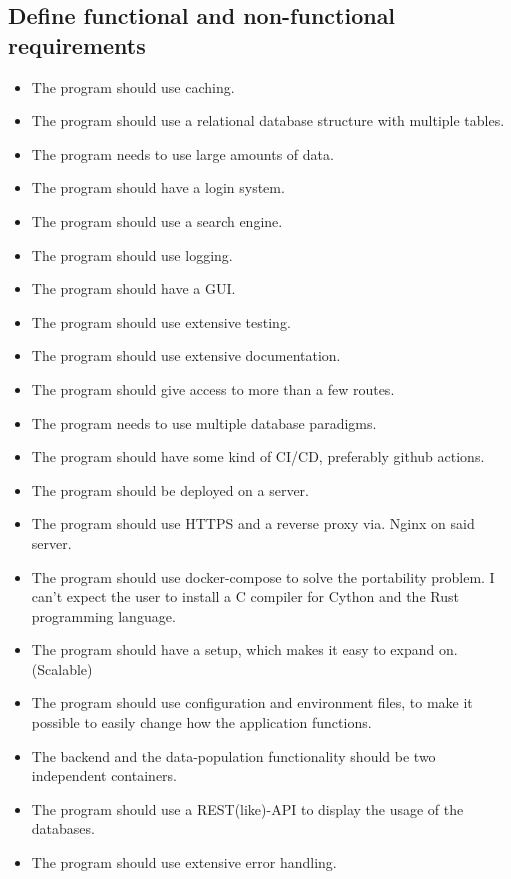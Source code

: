 \documentclass[a4paper, 12pt]{article}
\begin{document}
\subsection{Define functional and non-functional requirements}
\begin{itemize}
	\item The program should use caching.
	\item The program should use a relational database structure with multiple tables.
	\item The program needs to use large amounts of data.
	\item The program should have a login system.
	\item The program should use a search engine.
	\item The program should use logging.
	\item The program should have a GUI.
	\item The program should use extensive testing.
	\item The program should use extensive documentation.
	\item The program should give access to more than a few routes.
	\item The program needs to use multiple database paradigms.
	\item The program should have some kind of CI/CD, preferably github actions.
	\item The program should be deployed on a server.
	\item The program should use HTTPS and a reverse proxy via. Nginx on said server. 
	\item The program should use docker-compose to solve the portability problem. I can't expect the user to install a C compiler for Cython and the Rust programming language.
	\item The program should have a setup, which makes it easy to expand on. (Scalable)
	\item The program should use configuration and environment files, to make it possible to easily change how the application functions.
	\item The backend and the data-population functionality should be two independent containers.
	\item The program should use a REST(like)-API to display the usage of the databases.
	\item The program should use extensive error handling.
\end{itemize}
\end{document}
